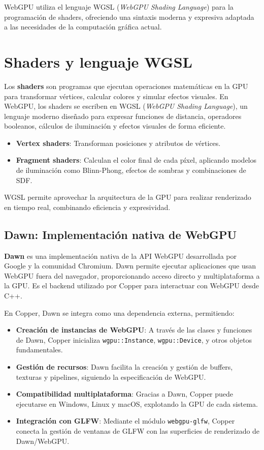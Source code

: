 WebGPU utiliza el lenguaje WGSL (\textit{WebGPU Shading Language}) para la
programación de shaders, ofreciendo una sintaxis moderna y expresiva adaptada a
las necesidades de la computación gráfica actual.

\section{Shaders y lenguaje WGSL}

Los \textbf{shaders} son programas que ejecutan operaciones matemáticas en la
GPU para transformar vértices, calcular colores y simular efectos visuales. En
WebGPU, los shaders se escriben en WGSL (\textit{WebGPU Shading Language}), un
lenguaje moderno diseñado para expresar funciones de distancia, operadores
booleanos, cálculos de iluminación y efectos visuales de forma eficiente.

\begin{itemize}
    \item \textbf{Vertex shaders}: Transforman posiciones y atributos de vértices.
    \item \textbf{Fragment shaders}: Calculan el color final de cada píxel, aplicando modelos de iluminación como Blinn-Phong, efectos de sombras y combinaciones de SDF.
\end{itemize}

WGSL permite aprovechar la arquitectura de la GPU para realizar renderizado en
tiempo real, combinando eficiencia y expresividad.

\subsection{Dawn: Implementación nativa de WebGPU}

\textbf{Dawn} es una implementación nativa de la API WebGPU desarrollada por Google y la comunidad Chromium\cite{dawn}. Dawn permite ejecutar aplicaciones que usan WebGPU fuera del navegador, proporcionando acceso directo y multiplataforma a la GPU. Es el backend utilizado por Copper para interactuar con WebGPU desde C++.

En Copper, Dawn se integra como una dependencia externa, permitiendo:

\begin{itemize}
    \item \textbf{Creación de instancias de WebGPU}: A través de las clases y funciones de Dawn, Copper inicializa \texttt{wgpu::Instance}, \texttt{wgpu::Device}, y otros objetos fundamentales.
    \item \textbf{Gestión de recursos}: Dawn facilita la creación y gestión de buffers, texturas y pipelines, siguiendo la especificación de WebGPU.
    \item \textbf{Compatibilidad multiplataforma}: Gracias a Dawn, Copper puede ejecutarse en Windows, Linux y macOS, explotando la GPU de cada sistema.
    \item \textbf{Integración con GLFW}: Mediante el módulo \texttt{webgpu-glfw}, Copper conecta la gestión de ventanas de GLFW con las superficies de renderizado de Dawn/WebGPU.
\end{itemize}

